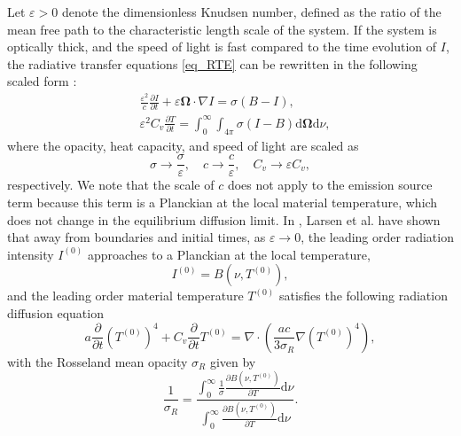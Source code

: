 \documentclass[preprint,12pt]{elsarticle}
\theoremstyle{definition}
\theoremstyle{plain}
\numberwithin{equation}{section}
\numberwithin{algorithm}{section}
\newcounter{eq_count}
\newcommand{\vOmega}{\mathbf{\Omega}}
\newcommand{\dd}{{\text{d}}}
\newcommand{\pdrv}[2]{\frac{\partial{#1}}{\partial{#2}}}
\begin{document}
Let  $\varepsilon > 0$ denote the dimensionless Knudsen number, defined as the ratio of the mean free path to the characteristic length scale of the system. If the system
is optically thick, and the speed of light is fast compared to the time evolution of $I$, the  radiative transfer equations \eqref{eq_RTE} can be rewritten in the following scaled form \cite{larsen2013properties}:
\begin{equation} \label{eq_RTE_scaled}
    \begin{aligned}
		&\frac{\varepsilon^2}{c} \frac{\partial I}{\partial t}+\varepsilon \vOmega \cdot \nabla I=\sigma (B -I), 
             \\ 
		&\varepsilon^2 C_v \pdrv{T}{t}=\int_0^{\infty} \int_{4 \pi} \sigma(I-B) \dd{\vOmega}\dd{\nu},
    \end{aligned}
\end{equation}
where the opacity, heat capacity, and speed of light are scaled as
\begin{equation}\label{eq_diffusiveScale}
\sigma  \rightarrow \frac{\sigma}{\varepsilon}, \quad c \rightarrow \frac{c}{\varepsilon}, \quad C_v \rightarrow \varepsilon C_v,
\end{equation}
respectively. We note that the scale of $c$ does not apply to the emission source term because this term is a Planckian at the local material temperature, which does not change in the equilibrium diffusion limit. In \cite{larsen1987asymptotic,larsen1983asymptotic}, Larsen et al. have shown that away from boundaries and initial times, as $\varepsilon \rightarrow 0$, the leading order radiation intensity $I^{(0)}$ approaches to a Planckian at the local temperature, 
		\begin{equation*}
			I^{(0)} = B(\nu,T^{(0)}),
		\end{equation*}
		and the leading order material temperature $T^{(0)}$ satisfies the following radiation diffusion equation
		\begin{equation}\label{eq_def_diffLimit}
			a \pdrv{}{t} (T^{(0)})^4 + C_v \pdrv{}{t}T^{(0)} = \nabla \cdot \left( \frac{ac}{3 \sigma_R} \nabla (T^{(0)})^4 \right),
		\end{equation}
		with the Rosseland mean opacity $\sigma_R$ given by 
		\begin{equation}\label{eq_def_Rosseland}
			\frac{1}{\sigma_R} 
			= \frac{\int_0^{\infty} \frac{1}{\sigma}  \pdrv{B(\nu,T^{(0)})}{T} \dd{\nu}}{ \int_0^{\infty}    \pdrv{B(\nu,T^{(0)})}{T}\dd{\nu} }.
		\end{equation}
\end{document}
